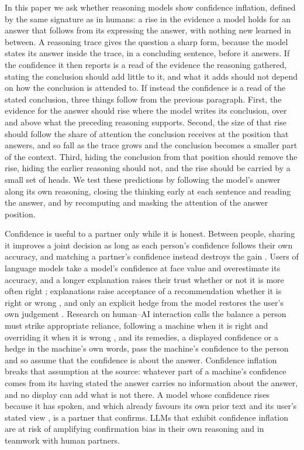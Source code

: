 \documentclass[11pt]{article}
\begin{document}
In this paper we ask whether reasoning models show confidence inflation, defined by the same signature as in humans: a rise in the evidence a model holds for an answer that follows from its expressing the answer, with nothing new learned in between. A reasoning trace gives the question a sharp form, because the model states its answer inside the trace, in a concluding sentence, before it answers. If the confidence it then reports is a read of the evidence the reasoning gathered, stating the conclusion should add little to it, and what it adds should not depend on how the conclusion is attended to. If instead the confidence is a read of the stated conclusion, three things follow from the previous paragraph. First, the evidence for the answer should rise where the model writes its conclusion, over and above what the preceding reasoning supports. Second, the size of that rise should follow the share of attention the conclusion receives at the position that answers, and so fall as the trace grows and the conclusion becomes a smaller part of the context. Third, hiding the conclusion from that position should remove the rise, hiding the earlier reasoning should not, and the rise should be carried by a small set of heads. We test these predictions by following the model's answer along its own reasoning, closing the thinking early at each sentence and reading the answer, and by recomputing and masking the attention of the answer position.

Confidence is useful to a partner only while it is honest. Between people, sharing it improves a joint decision as long as each person's confidence follows their own accuracy, and matching a partner's confidence instead destroys the gain \citep{bahrami2010optimally,bang2017confidence}. Users of language models take a model's confidence at face value and overestimate its accuracy, and a longer explanation raises their trust whether or not it is more often right \citep{steyvers2025what}; explanations raise acceptance of a recommendation whether it is right or wrong \citep{bansal2021does,bucinca2021trust}, and only an explicit hedge from the model restores the user's own judgement \citep{kim2024imnotsure}. Research on human--AI interaction calls the balance a person must strike appropriate reliance, following a machine when it is right and overriding it when it is wrong \citep{parasuraman1997humans,lee2004trust,schemmer2023appropriate}, and its remedies, a displayed confidence \citep{zhang2020effect} or a hedge in the machine's own words, pass the machine's confidence to the person and so assume that the confidence is about the answer. Confidence inflation breaks that assumption at the source: whatever part of a machine's confidence comes from its having stated the answer carries no information about the answer, and no display can add what is not there. A model whose confidence rises because it has spoken, and which already favours its own prior text \citep{panickssery2024llm} and its user's stated view \citep{sharma2024towards}, is a partner that confirms. LLMs that exhibit confidence inflation are at risk of amplifying confirmation bias in their own reasoning and in teamwork with human partners.
\end{document}
